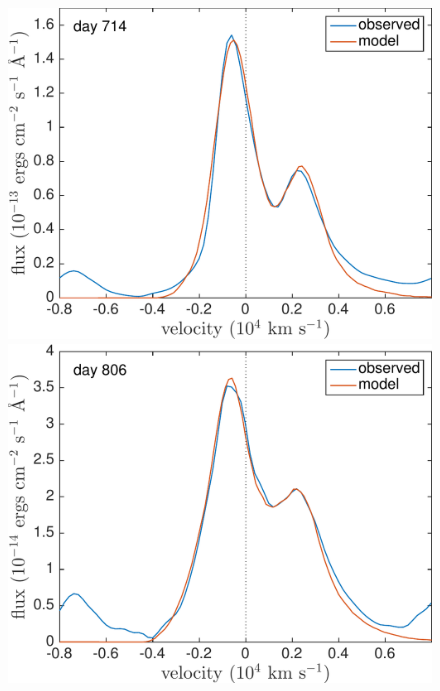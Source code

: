 \begin{figure}
\centering

\includegraphics[trim =0 25 0 0,clip=true,scale=0.4]{chapters/chapter5/images/clump_1/best_fit/d714OI_ext.pdf}
\hspace{1mm}
\includegraphics[trim =25 25 0 0,clip=true,scale=0.4]{chapters/chapter5/images/clump_1/best_fit/d806OI_ext.pdf}


\end{figure}
